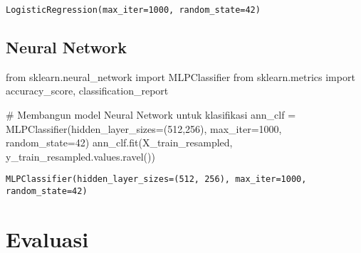 \documentclass[
  letterpaper,
]{krantz}
\makeatletter
\newenvironment{Shaded}{\begin{snugshade}}{\end{snugshade}}
\newcommand{\CommentTok}[1]{\textcolor[rgb]{0.37,0.37,0.37}{#1}}
\newcommand{\DecValTok}[1]{\textcolor[rgb]{0.68,0.00,0.00}{#1}}
\newcommand{\ImportTok}[1]{\textcolor[rgb]{0.00,0.46,0.62}{#1}}
\newcommand{\NormalTok}[1]{\textcolor[rgb]{0.00,0.23,0.31}{#1}}
\newcommand{\OperatorTok}[1]{\textcolor[rgb]{0.37,0.37,0.37}{#1}}
\newenvironment{kframe}{%
\medskip{}
\setlength{\fboxsep}{.8em}
 \def\at@end@of@kframe{}%
 \ifinner\ifhmode%
  \def\at@end@of@kframe{\end{minipage}}%
  \begin{minipage}{\columnwidth}%
 \fi\fi%
 \def\FrameCommand##1{\hskip\@totalleftmargin \hskip-\fboxsep
 \colorbox{shadecolor}{##1}\hskip-\fboxsep
     \hskip-\linewidth \hskip-\@totalleftmargin \hskip\columnwidth}%
 \MakeFramed {\advance\hsize-\width
   \@totalleftmargin\z@ \linewidth\hsize
   \@setminipage}}%
 {\par\unskip\endMakeFramed%
 \at@end@of@kframe}
\renewenvironment{Shaded}{\begin{kframe}}{\end{kframe}}
\makeatother
\begin{document}
\begin{verbatim}
LogisticRegression(max_iter=1000, random_state=42)
\end{verbatim}

\hypertarget{neural-network}{%
\subsection{Neural Network}\label{neural-network}}

\begin{Shaded}
\begin{Highlighting}[]
\ImportTok{from}\NormalTok{ sklearn.neural\_network }\ImportTok{import}\NormalTok{ MLPClassifier}
\ImportTok{from}\NormalTok{ sklearn.metrics }\ImportTok{import}\NormalTok{ accuracy\_score, classification\_report}

\CommentTok{\# Membangun model Neural Network untuk klasifikasi}
\NormalTok{ann\_clf }\OperatorTok{=}\NormalTok{ MLPClassifier(hidden\_layer\_sizes}\OperatorTok{=}\NormalTok{(}\DecValTok{512}\NormalTok{,}\DecValTok{256}\NormalTok{), max\_iter}\OperatorTok{=}\DecValTok{1000}\NormalTok{, random\_state}\OperatorTok{=}\DecValTok{42}\NormalTok{)}
\NormalTok{ann\_clf.fit(X\_train\_resampled, y\_train\_resampled.values.ravel())}
\end{Highlighting}
\end{Shaded}

\begin{verbatim}
MLPClassifier(hidden_layer_sizes=(512, 256), max_iter=1000, random_state=42)
\end{verbatim}

\hypertarget{evaluasi}{%
\section{Evaluasi}\label{evaluasi}}
\end{document}
